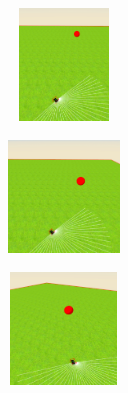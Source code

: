 \begin{figure}[htbp]
\begin{subfigure}[t]{0.2\textwidth}
    \includegraphics[width=3cm, height=3cm]{img/BallPibot4.png}
\label{fig:figure1_4}
\end{subfigure}\hfill
\begin{subfigure}[t]{0.2\textwidth}
    \includegraphics[width=3cm, height=3cm]{img/BallPibot5.png}
\label{fig:figure1_5}
\end{subfigure}\hfill
\begin{subfigure}[t]{0.2\textwidth}
    \includegraphics[width=3cm, height=3cm]{img/BallPibot6.png}
\label{fig:figure1_6}
\end{subfigure}


\end{figure}
